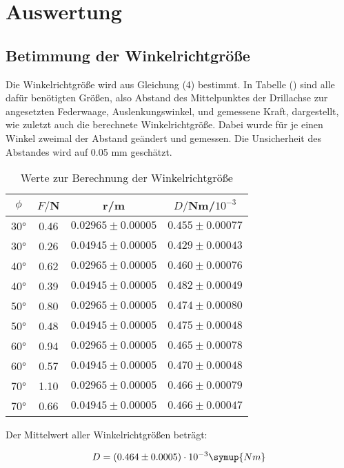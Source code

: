 \section{Auswertung}
\label{sec:Auswertung}

\subsection{Betimmung der Winkelrichtgröße}
Die Winkelrichtgröße wird aus Gleichung (4) bestimmt. In Tabelle () sind alle dafür benötigten Größen, also 
Abstand des Mittelpunktes der Drillachse zur angesetzten Federwaage, Auslenkungswinkel, und gemessene Kraft, dargestellt, 
wie zuletzt auch die berechnete Winkelrichtgröße. Dabei wurde für je einen Winkel zweimal der Abstand geändert und
gemessen. Die Unsicherheit des Abstandes wird auf 0.05 mm geschätzt.


\begin{table}[H]
  \centering
  \caption{Werte zur Berechnung der Winkelrichtgröße}
  \label{tab:Parameter}
  \begin{tabular}{c c c c}
    \toprule
    $\phi$ & $F/$N & r/m & $D/$Nm/$10^{-3}$\\
    \bottomrule
     30° & 0.46  & $0.02965 \pm 0.00005$ & $0.455 \pm 0.00077$ \\
     30° & 0.26  & $0.04945 \pm 0.00005$ & $0.429 \pm 0.00043$\\
     40° & 0.62  & $0.02965 \pm 0.00005$ & $0.460 \pm 0.00076$\\
     40° & 0.39  & $0.04945 \pm 0.00005$ & $0.482 \pm 0.00049$\\
     50° & 0.80  & $0.02965 \pm 0.00005$ & $0.474 \pm 0.00080$\\
     50° & 0.48  & $0.04945 \pm 0.00005$ & $0.475 \pm 0.00048$\\
     60° & 0.94  & $0.02965 \pm 0.00005$ & $0.465 \pm 0.00078$\\
     60° & 0.57  & $0.04945 \pm 0.00005$ & $0.470 \pm 0.00048$\\
     70° & 1.10  & $0.02965 \pm 0.00005$ & $0.466 \pm 0.00079$\\
     70° & 0.66  & $0.04945 \pm 0.00005$ & $0.466 \pm 0.00047$\\
    \bottomrule
  \end{tabular}
\end{table}

Der Mittelwert aller Winkelrichtgrößen beträgt:

\begin{equation}
  D = (0.464 \pm 0.0005)\cdot 10^{-3} \symup{Nm}
\end{equation}






